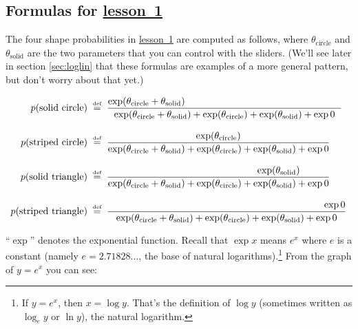 \documentclass[11pt]{article}
\newcommand{\defeq}{\;\stackrel{\mbox{\tiny def}}{=}\;}
\newcommand{\lesson}[1]{\href{http://cs.jhu.edu/~jason/tutorials/loglin/\##1}{lesson~#1}}
\begin{document}
\subsection{Formulas for \lesson{1}}

The four shape probabilities in \lesson{1} are computed as follows,
where $\theta_{\textrm{circle}}$ and $\theta_{\textrm{solid}}$ are the
two parameters that you can control with the sliders.  (We'll see later
in section \ref{sec:loglin} that these formulas are examples of a more
general pattern, but don't worry about that yet.)


\begin{align}
p(\text{solid circle}) & \defeq \frac{\exp (\theta_{\textrm{circle}}+\theta_{\textrm{solid}})\hspace{57mm}}{\exp (\theta_{\textrm{circle}} + \theta_{\textrm{solid}}) + \exp (\theta_{\textrm{circle}}) + \exp (\theta_{\textrm{solid}}) + \exp 0} \label{eqn:solidcircle}\\
\rule{0in}{1.5\baselineskip}
p(\text{striped circle}) & \defeq \frac{\exp (\theta_{\textrm{circle}})\hspace{0mm}}{\exp (\theta_{\textrm{circle}} + \theta_{\textrm{solid}}) + \exp (\theta_{\textrm{circle}}) + \exp (\theta_{\textrm{solid}}) + \exp 0} \label{eqn:stripedcircle}\\
\rule{0in}{1.5\baselineskip}
p(\text{solid triangle}) & \defeq \frac{\hspace{44mm}\exp (\theta_{\textrm{solid}})}{\exp (\theta_{\textrm{circle}} + \theta_{\textrm{solid}}) + \exp (\theta_{\textrm{circle}}) + \exp (\theta_{\textrm{solid}}) + \exp 0} \label{eqn:solidtriangle}\\
\rule{0in}{1.5\baselineskip}
p(\text{striped triangle}) & \defeq \frac{\hspace{79mm}\exp 0}{\exp (\theta_{\textrm{circle}} + \theta_{\textrm{solid}}) + \exp (\theta_{\textrm{circle}}) + \exp (\theta_{\textrm{solid}}) + \exp 0} \label{eqn:stripedtriangle}
\end{align}

``$\exp$'' denotes the exponential function.  Recall that $\exp x$ means
$e^x$ where $e$ is a constant (namely $e=2.71828\ldots$, the base of
natural logarithms).\footnote{If $y=e^x$, then $x=\log y$.  That's the
  definition of $\log y$ (sometimes written as $\log_e y$ or $\ln y$),
  the natural logarithm.}  From the graph of $y=e^x$ you can see:
\end{document}
